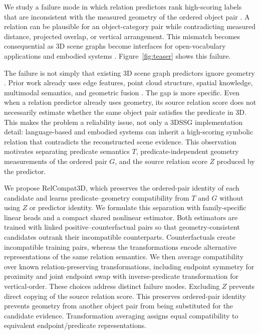 We study a failure mode in which relation predictors rank high-scoring labels that are inconsistent with the measured geometry of the ordered object pair \cite{nguyen2026relwitness,neau2026visual}. A relation can be plausible for an object-category pair while contradicting measured distance, projected overlap, or vertical arrangement. This mismatch becomes consequential as 3D scene graphs become interfaces for open-vocabulary applications and embodied systems \cite{koch2024open3dsg,hou2025fross,zhang2025open,wang2025open,saxena2025zing,fei2026open,madhavaram2026vizor}. Figure~\ref{fig:teaser} shows this failure.

The failure is not simply that existing 3D scene graph predictors ignore geometry \cite{wald2020learning}. Prior work already uses edge features, point cloud structure, spatial knowledge, multimodal semantics, and geometric fusion \cite{zhang2021exploiting,feng20233d,wang2023vl,koch2024sgrec3d,chen2024clip}. The gap is more specific. Even when a relation predictor already uses geometry, its source relation score does not necessarily estimate whether the same object pair satisfies the predicate in 3D. This makes the problem a reliability issue, not only a 3DSSG implementation detail: language-based and embodied systems can inherit a high-scoring symbolic relation that contradicts the reconstructed scene evidence. This observation motivates separating predicate semantics $T$, predicate-independent geometry measurements of the ordered pair $G$, and the source relation score $Z$ produced by the
predictor.

We propose RelCompat3D, which preserves the ordered-pair identity of each candidate and learns predicate--geometry compatibility from $T$ and $G$ without using $Z$ or predictor identity. We formulate this separation with family-specific linear heads and a compact shared nonlinear estimator. Both estimators are trained with linked positive--counterfactual pairs so that geometry-consistent candidates outrank their incompatible counterparts. Counterfactuals create incompatible training pairs, whereas the transformations encode alternative representations of the same relation semantics. We then average compatibility over known relation-preserving transformations, including endpoint symmetry for proximity and joint endpoint swap with inverse-predicate transformation for vertical-order. These choices address distinct failure modes. Excluding $Z$ prevents direct copying of the source relation score. This preserves ordered-pair identity prevents geometry from another object pair from being substituted for the candidate evidence. Transformation averaging assigns equal compatibility to equivalent endpoint/predicate representations. 

